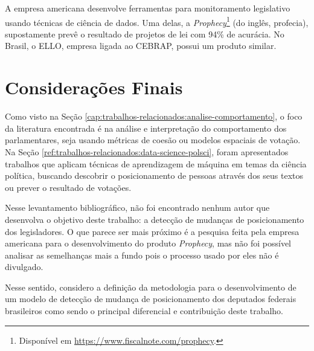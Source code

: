 A empresa americana  desenvolve ferramentas para
monitoramento legislativo usando técnicas de ciência de dados. Uma delas, a
\emph{Prophecy}\footnote{Disponível em
\url{https://www.fiscalnote.com/prophecy}.} (do inglês, profecia), supostamente
prevê o resultado de projetos de lei com 94\% de acurácia. No Brasil, o
\gls{ELLO}, empresa ligada ao \gls{CEBRAP}, possui um produto similar.

\section{Considerações Finais}

Como visto na Seção \ref{cap:trabalhos-relacionados:analise-comportamento}, o
foco da literatura encontrada é na análise e interpretação do comportamento dos
parlamentares, seja usando métricas de coesão ou modelos espaciais de votação.
Na Seção \ref{ref:trabalhos-relacionados:data-science-polsci}, foram
apresentados trabalhos que aplicam técnicas de aprendizagem de máquina em temas
da ciência política, buscando descobrir o posicionamento de pessoas através dos
seus textos ou prever o resultado de votações.

Nesse levantamento bibliográfico, não foi encontrado nenhum autor que
desenvolva o objetivo deste trabalho: a detecção de mudanças de posicionamento
dos legisladores. O que parece ser mais próximo é a pesquisa feita pela empresa
americana  para o desenvolvimento do produto
\emph{Prophecy}, mas não foi possível analisar as semelhanças mais a fundo pois
o processo usado por eles não é divulgado.

Nesse sentido, considero a definição da metodologia para o desenvolvimento de
um modelo de detecção de mudança de posicionamento dos deputados federais
brasileiros como sendo o principal diferencial e contribuição deste trabalho.
